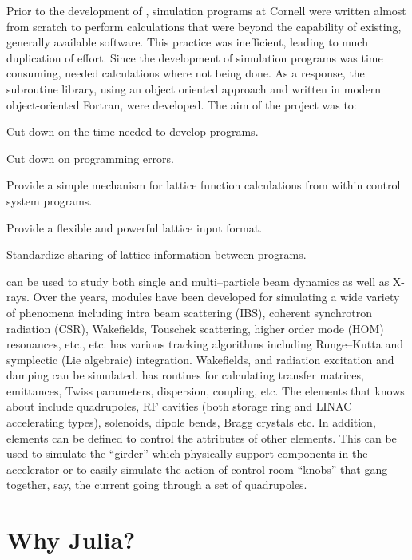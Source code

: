 Prior to the development of \bmad, simulation programs at Cornell were written almost from scratch
to perform calculations that were beyond the capability of existing, generally available software.
This practice was inefficient, leading to much duplication of effort. Since the development of
simulation programs was time consuming, needed calculations where not being done. As a response, the
\bmad subroutine library, using an object oriented approach and written in modern object-oriented
Fortran, were developed. The aim of the \bmad project was to:
\begin{Itemize}
\item Cut down on the time needed to develop programs.
\item Cut down on programming errors.
\item Provide a simple mechanism for lattice function calculations
from within control system programs.
\item Provide a flexible and powerful lattice input format.
\item Standardize sharing of lattice information between 
programs.
\end{Itemize}

\bmad can be used to study both single and multi--particle beam dynamics as well as X-rays.  Over
the years, \bmad modules have been developed for simulating a wide variety of phenomena including
intra beam scattering (IBS), coherent synchrotron radiation (CSR), Wakefields, Touschek scattering,
higher order mode (HOM) resonances, etc., etc.  \bmad has various tracking algorithms including
Runge--Kutta and symplectic (Lie algebraic) integration. Wakefields, and radiation excitation and
damping can be simulated. \bmad has routines for calculating transfer matrices, emittances, Twiss
parameters, dispersion, coupling, etc. The elements that \bmad knows about include quadrupoles, RF
cavities (both storage ring and LINAC accelerating types), solenoids, dipole bends, Bragg crystals
etc.  In addition, elements can be defined to control the attributes of other elements. This can be
used to simulate the ``girder'' which physically support components in the accelerator or to easily
simulate the action of control room ``knobs'' that gang together, say, the current going through a
set of quadrupoles.

\section{Why Julia?}

